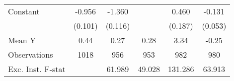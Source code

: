{\begin{tabular}{l*{5}{c}}
\addlinespace
Constant            &      -0.956\sym{***}&      -1.360\sym{***}&                     &       0.460\sym{**} &      -0.131\sym{**} \\
                    &     (0.101)         &     (0.116)         &                     &     (0.187)         &     (0.053)         \\
\midrule
Mean Y              &        0.44         &        0.27         &        0.28         &        3.34         &       -0.25         \\
Observations        &        1018         &         956         &         953         &         982         &         980         \\
Exc. Inst. F-stat   &                     &      61.989         &      49.028         &     131.286         &      63.913         \\
\bottomrule
\end{tabular}
}

